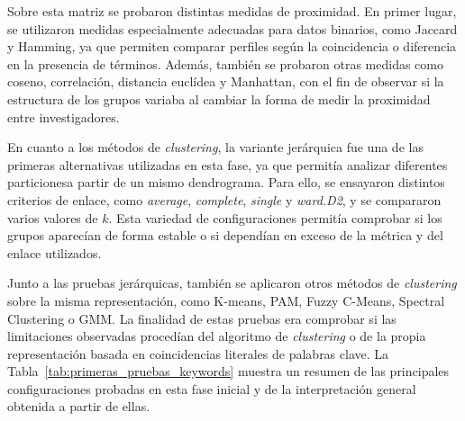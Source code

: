 \documentclass[11pt,spanish,listoffigures,listoftables]{tfgetsinf}
\begin{document}
Sobre esta matriz se probaron distintas medidas de proximidad. En primer lugar, se utilizaron medidas especialmente adecuadas para datos binarios, como Jaccard y Hamming, ya que permiten comparar perfiles según la coincidencia o diferencia en la presencia de términos. Además, también se probaron otras medidas como coseno, correlación, distancia euclídea y Manhattan, con el fin de observar si la estructura de los grupos variaba al cambiar la forma de medir la proximidad entre investigadores.

En cuanto a los métodos de \textit{clustering}, la variante jerárquica fue una de las primeras alternativas utilizadas en esta fase, ya que permitía analizar diferentes particionesa partir de un mismo dendrograma. Para ello, se ensayaron distintos criterios de enlace, como \textit{average}, \textit{complete}, \textit{single} y \textit{ward.D2}, y se compararon varios valores de \(k\). Esta variedad de configuraciones permitía comprobar si los grupos aparecían de forma estable o si dependían en exceso de la métrica y del enlace utilizados.

Junto a las pruebas jerárquicas, también se aplicaron otros métodos de \textit{clustering} sobre la misma representación, como K-means, PAM, Fuzzy C-Means, Spectral Clustering o GMM. La finalidad de estas pruebas era comprobar si las limitaciones observadas procedían del algoritmo de \textit{clustering} o de la propia representación basada en coincidencias literales de palabras clave. La Tabla~\ref{tab:primeras_pruebas_keywords} muestra un resumen de las principales configuraciones probadas en esta fase inicial y de la interpretación general obtenida a partir de ellas.
\end{document}
